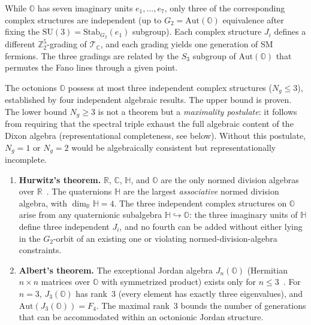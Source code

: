 While $\mathbb{O}$ has seven imaginary units $e_1, \ldots, e_7$, only three of the corresponding complex structures are independent (up to $G_2 = \mathrm{Aut}(\mathbb{O})$ equivalence after fixing the $\mathrm{SU}(3) = \mathrm{Stab}_{G_2}(e_1)$ subgroup). Each complex structure $J_i$ defines a different $\mathbb{Z}_2^5$-grading of $\mathcal{T}_{\mathbb{C}}$, and each grading yields one generation of SM fermions. The three gradings are related by the $S_3$ subgroup of $\mathrm{Aut}(\mathbb{O})$ that permutes the Fano lines through a given point.

\begin{theorem}\label{thm:4-3}
The octonions $\mathbb{O}$ possess at most three independent complex structures ($N_g \leq 3$), established by four independent algebraic results. The upper bound is proven. The lower bound $N_g \geq 3$ is not a theorem but a \emph{maximality postulate}: it follows from requiring that the spectral triple exhaust the full algebraic content of the Dixon algebra (representational completeness, see below). Without this postulate, $N_g = 1$ or $N_g = 2$ would be algebraically consistent but representationally incomplete.

\begin{enumerate}
  \item \textbf{Hurwitz's theorem.} $\mathbb{R}$, $\mathbb{C}$, $\mathbb{H}$, and $\mathbb{O}$ are the only normed division algebras over $\mathbb{R}$~\cite{ch4:Hurwitz1898}. The quaternions $\mathbb{H}$ are the largest \emph{associative} normed division algebra, with $\dim_{\mathbb{R}} \mathbb{H} = 4$. The three independent complex structures on $\mathbb{O}$ arise from any quaternionic subalgebra $\mathbb{H} \hookrightarrow \mathbb{O}$: the three imaginary units of $\mathbb{H}$ define three independent $J_i$, and no fourth can be added without either lying in the $G_2$-orbit of an existing one or violating normed-division-algebra constraints.

  \item \textbf{Albert's theorem.} The exceptional Jordan algebra $J_n(\mathbb{O})$ (Hermitian $n \times n$ matrices over $\mathbb{O}$ with symmetrized product) exists only for $n \leq 3$~\cite{ch4:Albert1934,ch4:TodorovDV2018}. For $n = 3$, $J_3(\mathbb{O})$ has rank~3 (every element has exactly three eigenvalues), and $\mathrm{Aut}(J_3(\mathbb{O})) = F_4$. The maximal rank~3 bounds the number of generations that can be accommodated within an octonionic Jordan structure.


\end{enumerate}
\end{theorem}

